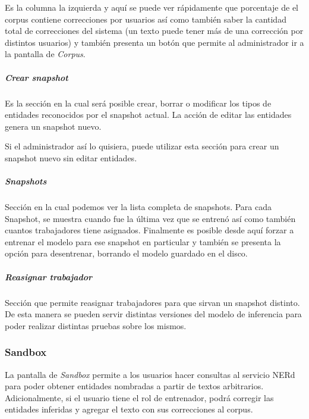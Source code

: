 \documentclass[12pt,a4paper,]{scrartcl}
\let\oldsubparagraph\subparagraph
\renewcommand{\subparagraph}[1]{\oldsubparagraph{#1}\mbox{}}
\begin{document}
Es la columna la izquierda y aquí se puede ver rápidamente que porcentaje de el corpus contiene correcciones por usuarios así como también saber la cantidad total de correcciones del sistema (un texto puede tener más de una corrección por distintos usuarios) y también presenta un botón que permite al administrador ir a la pantalla de \emph{Corpus}.

\hypertarget{crear-snapshot}{%
\subparagraph{Crear snapshot}\label{crear-snapshot}}

Es la sección en la cual será posible crear, borrar o modificar los tipos de entidades reconocidos por el snapshot actual. La acción de editar las entidades genera un snapshot nuevo.

Si el administrador así lo quisiera, puede utilizar esta sección para crear un snapshot nuevo sin editar entidades.

\hypertarget{snapshots}{%
\subparagraph{Snapshots}\label{snapshots}}

Sección en la cual podemos ver la lista completa de snapshots.
Para cada Snapshot, se muestra cuando fue la última vez que se entrenó así como también cuantos trabajadores tiene asignados. Finalmente es posible desde aquí forzar a entrenar el modelo para ese snapshot en particular y también se presenta la opción para desentrenar, borrando el modelo guardado en el disco.

\hypertarget{reasignar-trabajador}{%
\subparagraph{Reasignar trabajador}\label{reasignar-trabajador}}

Sección que permite reasignar trabajadores para que sirvan un snapshot distinto. De esta manera se pueden servir distintas versiones del modelo de inferencia para poder realizar distintas pruebas sobre los mismos.

\hypertarget{sandbox}{%
\subsubsection{Sandbox}\label{sandbox}}

La pantalla de \emph{Sandbox} permite a los usuarios hacer consultas al servicio NERd para poder obtener entidades nombradas a partir de textos arbitrarios.
Adicionalmente, si el usuario tiene el rol de entrenador, podrá corregir las entidades inferidas y agregar el texto con sus correcciones al corpus.
\end{document}

